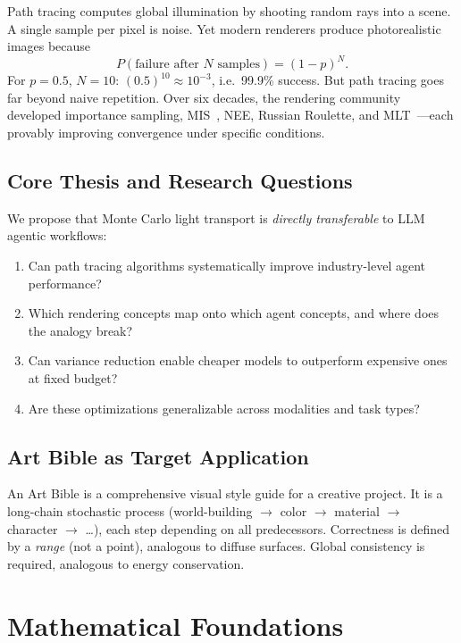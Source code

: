 \documentclass[11pt,twocolumn]{article}
\theoremstyle{definition}
\begin{document}
Path tracing computes global illumination by shooting random rays into a scene.
A single sample per pixel is noise.
Yet modern renderers produce photorealistic images because
\begin{equation}\label{eq:failure}
  P(\text{failure after } N \text{ samples}) = (1-p)^N.
\end{equation}
For $p=0.5$, $N=10$: $(0.5)^{10} \approx 10^{-3}$, i.e.\ 99.9\% success.
But path tracing goes far beyond naive repetition.
Over six decades, the rendering community developed
importance sampling, MIS~\citep{veach1995optimally},
NEE, Russian Roulette, and MLT~\citep{veach1997metropolis}---each
provably improving convergence under specific conditions.

\subsection{Core Thesis and Research Questions}

We propose that Monte Carlo light transport is \emph{directly transferable}
to LLM agentic workflows:
\begin{enumerate}[label=\textbf{RQ\arabic*},leftmargin=2em]
  \item Can path tracing algorithms systematically improve industry-level agent performance?
  \item Which rendering concepts map onto which agent concepts, and where does the analogy break?
  \item Can variance reduction enable cheaper models to outperform expensive ones at fixed budget?
  \item Are these optimizations generalizable across modalities and task types?
\end{enumerate}

\subsection{Art Bible as Target Application}

An Art Bible is a comprehensive visual style guide for a creative project.
It is a long-chain stochastic process (world-building $\to$ color $\to$ material $\to$ character $\to$ \ldots),
each step depending on all predecessors.
Correctness is defined by a \emph{range} (not a point), analogous to diffuse surfaces.
Global consistency is required, analogous to energy conservation.

\section{Mathematical Foundations}\label{sec:math}
\end{document}
